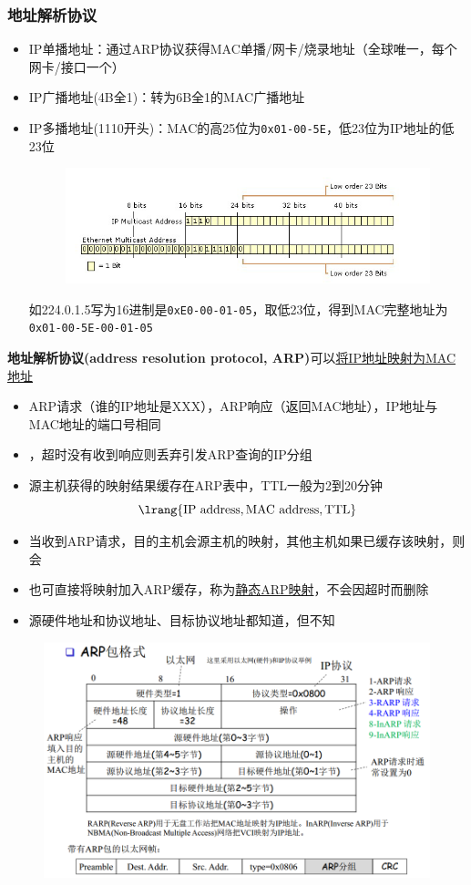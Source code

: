 \subsubsection{地址解析协议}
\begin{itemize}
	\item IP单播地址：通过ARP协议获得MAC单播/网卡/烧录地址（全球唯一，每个网卡/接口一个）
	\item IP广播地址(4B全1)：转为6B全1的MAC广播地址
	\item IP多播地址(1110开头)：MAC的高25位为\verb'0x01-00-5E'，低23位为IP地址的低23位
	\begin{figure}[H]
		\centering
		\includegraphics[width=0.8\linewidth]{fig/ip_mac.png}
	\end{figure}
	如224.0.1.5写为16进制是\verb'0xE0-00-01-05'，取低23位，得到MAC完整地址为\verb'0x01-00-5E-00-01-05'
\end{itemize}

\textbf{地址解析协议(address resolution protocol, ARP)}可以\underline{将IP地址映射为MAC地址}
\begin{itemize}
	\item ARP请求（谁的IP地址是XXX），ARP响应（返回MAC地址），IP地址与MAC地址的端口号相同
	\item {}，超时没有收到响应则丢弃引发ARP查询的IP分组
	\item 源主机获得的映射结果缓存在ARP表中，TTL一般为2到20分钟
	\[\lrang{\text{IP address},\text{MAC address},\text{TTL}}\]
	\item 当收到ARP请求，目的主机会源主机的映射，其他主机如果已缓存该映射，则会
	\item 也可直接将映射加入ARP缓存，称为\underline{静态ARP映射}，不会因超时而删除
	\item 源硬件地址和协议地址、目标协议地址都知道，但不知
\end{itemize}
\begin{figure}[H]
	\centering
	\includegraphics[width=0.7\linewidth]{fig/ARP.PNG}
\end{figure}

